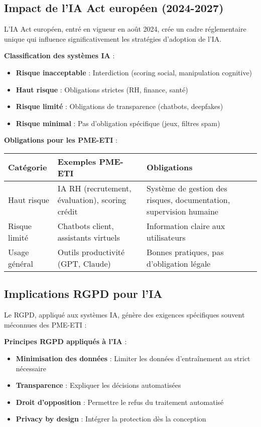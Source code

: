 \subsection{Impact de l'IA Act européen (2024-2027)}

L'IA Act européen, entré en vigueur en août 2024, crée un cadre réglementaire unique qui influence significativement les stratégies d'adoption de l'IA.

\textbf{Classification des systèmes IA} :
\begin{itemize}
    \item \textbf{Risque inacceptable} : Interdiction (scoring social, manipulation cognitive)
    \item \textbf{Haut risque} : Obligations strictes (RH, finance, santé)
    \item \textbf{Risque limité} : Obligations de transparence (chatbots, deepfakes)
    \item \textbf{Risque minimal} : Pas d'obligation spécifique (jeux, filtres spam)
\end{itemize}

\textbf{Obligations pour les PME-ETI} :
\begin{longtable}{@{}p{3cm}p{5cm}p{6cm}@{}}
\toprule
\textbf{Catégorie} & \textbf{Exemples PME-ETI} & \textbf{Obligations} \\
\midrule
Haut risque & IA RH (recrutement, évaluation), scoring crédit & Système de gestion des risques, documentation, supervision humaine \\
Risque limité & Chatbots client, assistants virtuels & Information claire aux utilisateurs \\
Usage général & Outils productivité (GPT, Claude) & Bonnes pratiques, pas d'obligation légale \\
\bottomrule
\end{longtable}

\subsection{Implications RGPD pour l'IA}

Le RGPD, appliqué aux systèmes IA, génère des exigences spécifiques souvent méconnues des PME-ETI :

\textbf{Principes RGPD appliqués à l'IA} :
\begin{itemize}
    \item \textbf{Minimisation des données} : Limiter les données d'entraînement au strict nécessaire
    \item \textbf{Transparence} : Expliquer les décisions automatisées
    \item \textbf{Droit d'opposition} : Permettre le refus du traitement automatisé
    \item \textbf{Privacy by design} : Intégrer la protection dès la conception
\end{itemize}

